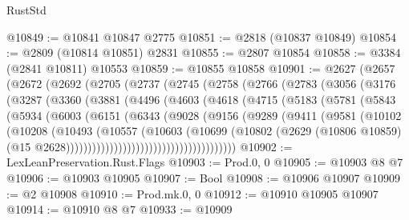 \begin{lexlean}{RustStd}
\begin{coremodule}
@10849 := @10841 @10847 @2775
@10851 := @2818 (@10837 @10849)
@10854 := @2809 (@10814 @10851) @2831
@10855 := @2807 @10854
@10858 := @3384 (@2841 @10811) @10553
@10859 := @10855 @10858
@10901 := @2627
    (@2657
      (@2672
        (@2692
          (@2705
            (@2737
              (@2745
                (@2758
                  (@2766
                    (@2783
                      (@3056
                        (@3176
                          (@3287
                            (@3360
                              (@3881
                                (@4496
                                  (@4603
                                    (@4618
                                      (@4715
                                        (@5183
                                          (@5781
                                            (@5843
                                              (@5934
                                                (@6003
                                                  (@6151
                                                    (@6343
                                                      (@9028
                                                        (@9156
                                                          (@9289
                                                            (@9411
                                                              (@9581
                                                                (@10102
                                                                  (@10208
                                                                    (@10493
                                                                      (@10557
                                                                        (@10603
                                                                          (@10699
                                                                            (@10802
                                                                              (@2629
                                                                                (@10806 @10859)
                                                                                (@15
                                                                                  @2628)))))))))))))))))))))))))))))))))))))))
@10902 := LexLeanPreservation.Rust.Flags
@10903 := Prod.{0, 0}
@10905 := @10903 @8 @7
@10906 := @10903 @10905
@10907 := Bool
@10908 := @10906 @10907
@10909 := @2 @10908
@10910 := Prod.mk.{0, 0}
@10912 := @10910 @10905 @10907
@10914 := @10910 @8 @7
@10933 := @10909

\end{coremodule}
\end{lexlean}
